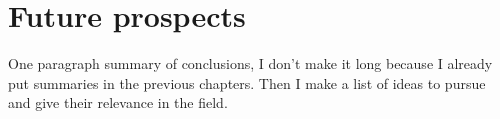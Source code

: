 \chapter{Future prospects}

One paragraph summary of conclusions, I don't make it long because I already put summaries in the previous chapters. Then I make a list of ideas to pursue and give their relevance in the field.
